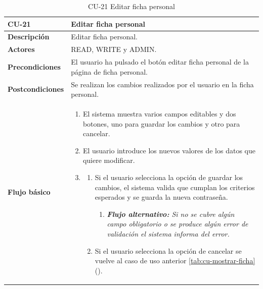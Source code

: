 \begin{table} [H]
    \centering
    \setlength{\leftmargini}{0.4cm}
	\resizebox{14cm}{!} { %
    \begin{tabular}{| m{3cm} | m{11cm} |}   
    \hline
	  \textbf{CU-21} & \textbf{Editar ficha personal} \\\hline
	  \textbf{Descripción} & Editar ficha personal. \\\hline
	  \textbf{Actores} & READ, WRITE y ADMIN. \\\hline
	  \textbf{Precondiciones} & El usuario ha pulsado el botón editar ficha personal de la página de ficha personal. \\\hline
	  \textbf{Postcondiciones} & Se realizan los cambios realizados por el usuario en la ficha personal. \\\hline
	  \textbf{Flujo básico} & 
		\begin{enumerate}
	  	\item El sistema muestra varios campos editables y dos botones, uno para guardar los cambios y otro para cancelar.
		\item El usuario introduce los nuevos valores de los datos que quiere modificar.
		\item 
		\begin{enumerate}		
			\item Si el usuario selecciona la opción de guardar los cambios, el sistema valida que cumplan los criterios esperados y se guarda la nueva contraseña.
			\begin{enumerate}	
			   \item \textit{\textbf{Flujo alternativo:} Si no se cubre algún campo obligatorio o se produce algún error de validación el sistema informa del error.}		   
			\end{enumerate}
			\item Si el usuario selecciona la opción de cancelar se vuelve al caso de uso anterior \ref{tab:cu-mostrar-ficha} (\pageref{tab:cu-mostrar-ficha}).
		\end{enumerate}
	  \end{enumerate} 	  	  
	  \\\hline
    \end{tabular}
    } %
    \caption{CU-21 Editar ficha personal}
    \label{tab:cu-editar-ficha}
\end{table}




